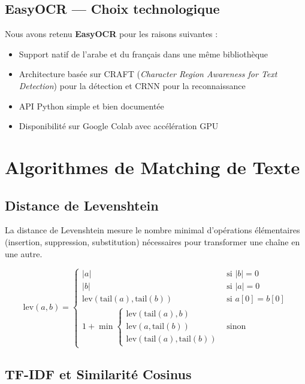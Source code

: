 \documentclass[12pt,a4paper]{report}
\newcommand{\en}[1]{\textit{\textit{#1}}}
\begin{document}
\subsection{EasyOCR --- Choix technologique}

Nous avons retenu \textbf{EasyOCR} pour les raisons suivantes :

\begin{itemize}
  \item Support natif de l'arabe et du fran\c{c}ais dans une m\^eme biblioth\`eque
  \item Architecture bas\'ee sur CRAFT (\en{Character Region Awareness for Text Detection}) pour la d\'etection et CRNN pour la reconnaissance
  \item API Python simple et bien document\'ee
  \item Disponibilit\'e sur Google Colab avec acc\'el\'eration GPU
\end{itemize}

\section{Algorithmes de Matching de Texte}

\subsection{Distance de Levenshtein}

La distance de Levenshtein mesure le nombre minimal d'op\'erations \'el\'ementaires (insertion, suppression, substitution) n\'ecessaires pour transformer une cha\^ine en une autre.

\begin{equation}
\text{lev}(a, b) = \begin{cases}
|a| & \text{si } |b| = 0 \\
|b| & \text{si } |a| = 0 \\
\text{lev}(\text{tail}(a), \text{tail}(b)) & \text{si } a[0] = b[0] \\
1 + \min\begin{cases}\text{lev}(\text{tail}(a), b)\\\text{lev}(a, \text{tail}(b))\\\text{lev}(\text{tail}(a), \text{tail}(b))\end{cases} & \text{sinon}
\end{cases}
\end{equation}

\subsection{TF-IDF et Similarit\'e Cosinus}
\end{document}
